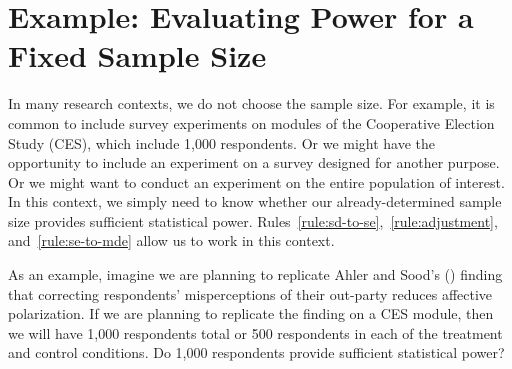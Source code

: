 \documentclass[12pt]{article}
\begin{document}
\section*{Example: Evaluating Power for a Fixed Sample Size}

In many research contexts, we do not choose the sample size.
For example, it is common to include survey experiments on modules of the Cooperative Election Study (CES), which include 1,000 respondents.
Or we might have the opportunity to include an experiment on a survey designed for another purpose.
Or we might want to conduct an experiment on the entire population of interest.
In this context, we simply need to know whether our already-determined sample size provides sufficient statistical power.
Rules~\ref{rule:sd-to-se},~\ref{rule:adjustment}, and~\ref{rule:se-to-mde} allow us to work in this context.

As an example, imagine we are planning to replicate Ahler and Sood's (\citeyear{Ahler2018}) finding that correcting respondents' misperceptions of their out-party reduces affective polarization.
If we are planning to replicate the finding on a CES module, then we will have 1,000 respondents total or 500 respondents in each of the treatment and control conditions.
Do 1,000 respondents provide sufficient statistical power?
\end{document}
